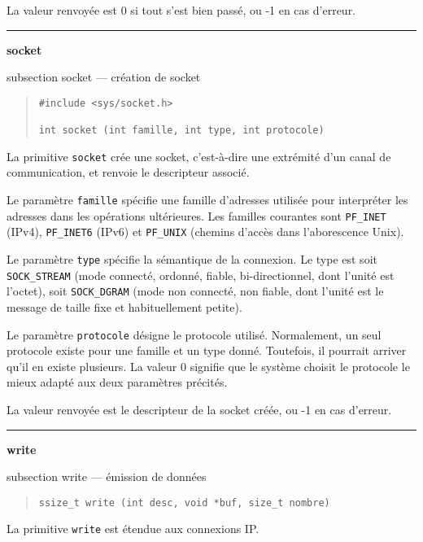 \documentclass [twoside] {report}
\newcommand {\primitive} [1]
    {
	\phantomsection
	{\large \bf #1}
	\addcontentsline {toc} {subsection} {#1}
    }
\newcommand {\separation}
    {
	\vspace {5mm}
	\nopagebreak
	\hrule
    }
\begin{document}
La valeur renvoyée est 0 si tout s'est bien passé, ou -1 en
cas d'erreur.



\separation
\primitive {socket} --- création de socket

\begin {quote}
\begin {verbatim}
#include <sys/socket.h>

int socket (int famille, int type, int protocole)
\end{verbatim}
\end {quote}

La primitive {\tt socket} crée une socket, c'est-à-dire
une extrémité d'un canal de communication, et renvoie le
descripteur associé.

Le paramètre {\tt famille} spécifie une famille d'adresses utilisée
pour interpréter les adresses dans les opérations ultérieures. Les
familles courantes sont {\tt PF\_INET} (IPv4), \texttt {PF\_INET6}
(IPv6) et {\tt PF\_UNIX} (chemins d'accès dans l'aborescence Unix).

Le paramètre {\tt type} spécifie la sémantique de la
connexion. Le type est soit {\tt SOCK\_STREAM} (mode
connecté, ordonné, fiable, bi-directionnel, dont l'unité est
l'octet), soit {\tt SOCK\_DGRAM} (mode non connecté, non
fiable, dont l'unité est le message de taille fixe et
habituellement petite).

Le paramètre {\tt protocole} désigne le protocole utilisé.
Normalement, un seul protocole existe pour une famille et un
type donné. Toutefois, il pourrait arriver qu'il en existe
plusieurs. La valeur 0 signifie que le système choisit le
protocole le mieux adapté aux deux paramètres précités.

La valeur renvoyée est le descripteur de la socket créée, ou
-1 en cas d'erreur.



\separation
\primitive {write} --- émission de données

\begin {quote}
\begin {verbatim}
ssize_t write (int desc, void *buf, size_t nombre)
\end{verbatim}
\end {quote}

La primitive {\tt write} est étendue aux connexions IP.

\end{document}
